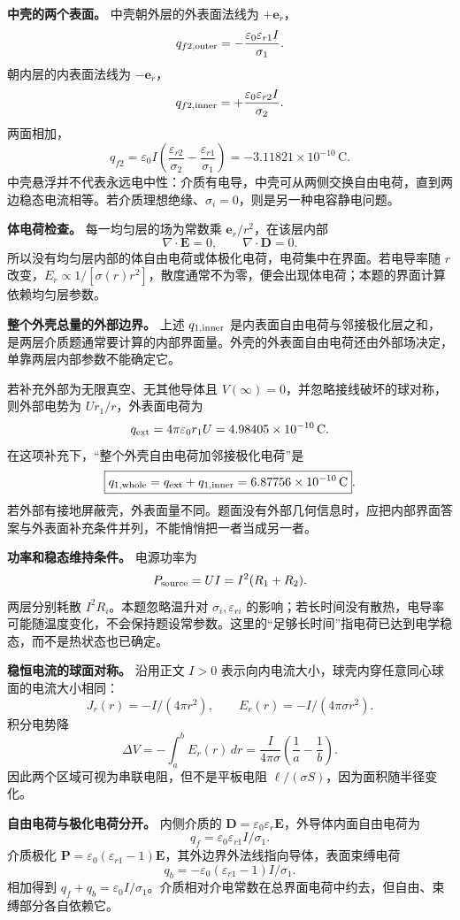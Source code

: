 \documentclass[12pt,a4paper,UTF8]{ctexart}
\begin{document}
\textbf{中壳的两个表面。} 中壳朝外层的外表面法线为
\(+\boldsymbol e_r\)， \[
q_{f2,\rm outer}
=-\frac{\varepsilon_0\varepsilon_{r1}I}{\sigma_1}.
\] 朝内层的内表面法线为 \(-\boldsymbol e_r\)， \[
q_{f2,\rm inner}
=+\frac{\varepsilon_0\varepsilon_{r2}I}{\sigma_2}.
\] 两面相加， \[
\boxed{q_{f2}=\varepsilon_0I
\left(\frac{\varepsilon_{r2}}{\sigma_2}
-\frac{\varepsilon_{r1}}{\sigma_1}\right)}
=\boxed{-3.11821\times10^{-10}\,\mathrm C}.
\]
中壳悬浮并不代表永远电中性：介质有电导，中壳可从两侧交换自由电荷，直到两边稳态电流相等。若介质理想绝缘、\(\sigma_i=0\)，则是另一种电容静电问题。

\textbf{体电荷检查。} 每一均匀层的场为常数乘
\(\boldsymbol e_r/r^2\)，在该层内部 \[
\nabla\cdot\boldsymbol E=0,\qquad
\nabla\cdot\boldsymbol D=0.
\]
所以没有均匀层内部的体自由电荷或体极化电荷，电荷集中在界面。若电导率随
\(r\)
改变，\(E_r\propto1/[\sigma(r)r^2]\)，散度通常不为零，便会出现体电荷；本题的界面计算依赖均匀层参数。

\textbf{整个外壳总量的外部边界。} 上述 \(q_{1,\rm inner}\)
是内表面自由电荷与邻接极化层之和，是两层介质题通常要计算的内部界面量。外壳的外表面自由电荷还由外部场决定，单靠两层内部参数不能确定它。

若补充外部为无限真空、无其他导体且
\(V(\infty)=0\)，并忽略接线破坏的球对称，则外部电势为
\(Ur_1/r\)，外表面电荷为 \[
q_{\rm ext}=4\pi\varepsilon_0r_1U
=4.98405\times10^{-10}\,\mathrm C.
\] 在这项补充下，``整个外壳自由电荷加邻接极化电荷''是 \[
\boxed{q_{1,\rm whole}=q_{\rm ext}+q_{1,\rm inner}
=6.87756\times10^{-10}\,\mathrm C}.
\]
若外部有接地屏蔽壳，外表面量不同。题面没有外部几何信息时，应把内部界面答案与外表面补充条件并列，不能悄悄把一者当成另一者。

\textbf{功率和稳态维持条件。} 电源功率为 \[
P_{\rm source}=UI=I^2(R_1+R_2).
\] 两层分别耗散 \(I^2R_i\)。本题忽略温升对 \(\sigma_i,\varepsilon_{ri}\)
的影响；若长时间没有散热，电导率可能随温度变化，不会保持题设常参数。这里的``足够长时间''指电荷已达到电学稳态，而不是热状态也已确定。

\textbf{稳恒电流的球面对称。} 沿用正文 \(I>0\)
表示向内电流大小，球壳内穿任意同心球面的电流大小相同： \[
J_r(r)=-I/(4\pi r^2),\qquad E_r(r)=-I/(4\pi\sigma r^2).
\] 积分电势降 \[
\Delta V=-\int_a^bE_r(r)\,dr
=\frac I{4\pi\sigma}\left(\frac1a-\frac1b\right).
\] 因此两个区域可视为串联电阻，但不是平板电阻
\(\ell/(\sigma S)\)，因为面积随半径变化。

\textbf{自由电荷与极化电荷分开。} 内侧介质的
\(\boldsymbol D=\varepsilon_0\varepsilon_r\boldsymbol E\)，外导体内面自由电荷为
\[
q_f=\varepsilon_0\varepsilon_{r1}I/\sigma_1.
\] 介质极化
\(\boldsymbol P=\varepsilon_0(\varepsilon_{r1}-1)\boldsymbol E\)，其外边界外法线指向导体，表面束缚电荷
\[
q_b=-\varepsilon_0(\varepsilon_{r1}-1)I/\sigma_1.
\] 相加得到
\(q_f+q_b=\varepsilon_0I/\sigma_1\)。介质相对介电常数在总界面电荷中约去，但自由、束缚部分各自依赖它。
\end{document}
